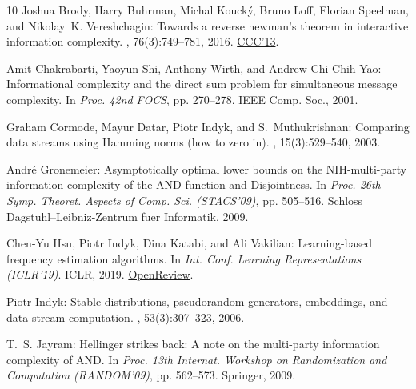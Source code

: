 \begin{thebibliography}{10}
{\sc Joshua Brody, Harry Buhrman, Michal Kouck{\'{y}}, Bruno Loff, Florian
  Speelman, and Nikolay~K. Vereshchagin}: Towards a reverse newman's theorem in
  interactive information complexity.
, 76(3):749--781, 2016.
\newblock \prelim \href{https://doi.org/10.1109/CCC.2013.12}{CCC'13}.
\newblock [\epfmtdoi{10.1007/s00453-015-0112-9}]

{\sc Amit Chakrabarti, Yaoyun Shi, Anthony Wirth, and Andrew Chi-Chih Yao}:
  Informational complexity and the direct sum problem for simultaneous message
  complexity.
\newblock In {\em Proc. 42nd FOCS}, pp. 270--278. IEEE Comp. Soc., 2001.

{\sc Graham Cormode, Mayur Datar, Piotr Indyk, and S.~Muthukrishnan}: Comparing
  data streams using {H}amming norms (how to zero in).
, 15(3):529--540, 2003.

{\sc Andr{\'{e}} Gronemeier}: Asymptotically optimal lower bounds on the
  {NIH}-multi-party information complexity of the {AND}-function and
  {D}isjointness.
\newblock In {\em Proc. 26th Symp. Theoret. Aspects of Comp. Sci. (STACS'09)},
  pp. 505--516. Schloss Dagstuhl--Leibniz-Zentrum fuer Informatik, 2009.

{\sc Chen-Yu Hsu, Piotr Indyk, Dina Katabi, and Ali Vakilian}: Learning-based
  frequency estimation algorithms.
\newblock In {\em Int. Conf. Learning Representations (ICLR'19)}. ICLR, 2019.
\newblock \href{https://openreview.net/forum?id=r1lohoCqY7}{OpenReview}.

{\sc Piotr Indyk}: Stable distributions, pseudorandom generators, embeddings,
  and data stream computation.
, 53(3):307--323, 2006.
\newblock [\epfmtdoi{10.1145/1147954.1147955}]

{\sc T.~S. Jayram}: Hellinger strikes back: {A} note on the multi-party
  information complexity of {AND}.
\newblock In {\em Proc. 13th Internat. Workshop on Randomization and
  Computation (RANDOM'09)}, pp. 562--573. Springer, 2009.
\newblock [\epfmtdoi{10.1007/978-3-642-03685-9\_42}]


\end{thebibliography}
